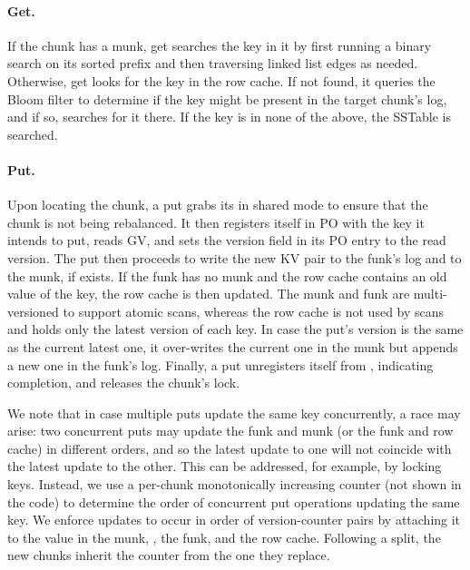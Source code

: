 
\paragraph{Get.}
If the chunk has a munk, {get} searches the key in it by first running a binary search on its sorted prefix and then traversing linked list edges as needed. 
Otherwise,  {get} looks for the key in the {row cache}. If not found, it queries 
the {Bloom filter} to determine if the key might be present in the target chunk's  
 {log}, and if so, searches for it there.  If the key is in none of the above, the {SSTable} is searched.


\paragraph{Put.}
Upon locating the chunk,  a {put} grabs its  in shared mode to ensure that the chunk is not being rebalanced.
It then registers itself in PO with the key it intends to put,
reads GV, and sets the version field in its PO entry to the read version. 
The {put} then proceeds to write the new KV pair to the  funk's {log} and to the 
munk, if exists. 
If the funk has no munk and the row cache contains an old value of the key, the row cache is then updated.
The munk and funk are multi-versioned to support atomic scans, 
whereas the row cache is not used by scans and holds only the latest version of each key. 
In case the put's version is the same as the current latest one, it over-writes the current one in the munk
but appends a new one in the funk's log. 
Finally, a put unregisters itself from , indicating completion, and releases the chunk's lock.

We note that in case multiple puts update the same key concurrently, a race may arise: 
two concurrent puts may update the funk and munk (or the funk and row cache) in  different orders,
and so the latest update to one will not coincide with the latest update to the other. 
This can be addressed, for example, by locking keys. 
Instead, we use a per-chunk monotonically increasing counter (not shown in the code) to determine 
the order of concurrent put operations updating the same key. %
We  enforce updates to occur in order of version-counter pairs by attaching it to the value in the munk, 
, the funk, and the row cache.
Following a split, the new chunks inherit the counter from the one they replace.  


